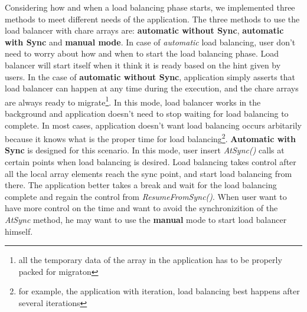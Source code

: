 Considering how and when a load balancing phase starts, we implemented three
methods to meet different needs of the application.
The three methods to use the load balancer with chare arrays are:
{\bf automatic without Sync}, {\bf automatic with Sync} and {\bf manual mode}.
In case of {\em automatic} load balancing, user don't need to worry about 
how and when to start the load balancing phase. Load balancer will start 
itself when it think it is ready based on the hint given by users.
In the case of {\bf automatic without Sync}, application simply asserts
that load balancer can happen at any time during the execution, and 
the chare arrays are always ready to migrate\footnote{all the temporary 
data of the array in the application has to be properly packed for migraton}. 
In this mode, load balancer works in the background and application 
doesn't need to stop waiting for load balancing to complete. In most cases, 
application doesn't want load balancing occurs arbitarily because it knows 
what is the proper time for load balancing\footnote{for example, the 
application with iteration, load balancing best happens after several 
iterations}. {\bf Automatic with Sync} is designed for this scenario. 
In this mode, user insert {\em AtSync()} calls at certain points when load 
balancing is desired. Load balancing takes control after all the 
local array elements reach the sync point, and start load balancing 
from there. The application better takes a break and wait for the load 
balancing complete and regain the control from {\em ResumeFromSync()}.
When user want to have more control on the time and want to avoid
the synchronizition of the {\em AtSync} method, he may want to use 
the {\bf manual} mode to start load balancer himself.

